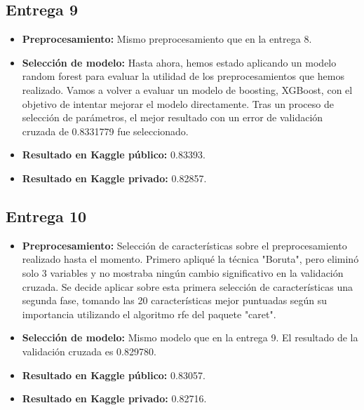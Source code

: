 \subsection{Entrega 9} %
\begin{itemize}
\item \textbf{Preprocesamiento:} Mismo preprocesamiento que en la entrega 8.
\item \textbf{Selección de modelo:} Hasta ahora, hemos estado aplicando un modelo random forest para evaluar la utilidad de los preprocesamientos que hemos realizado. Vamos a volver a evaluar un modelo de boosting, XGBoost, con el objetivo de intentar mejorar el modelo directamente. Tras un proceso de selección de parámetros, el mejor resultado con un error de validación cruzada de 0.8331779 fue seleccionado.
\item \textbf{Resultado en Kaggle público:} 0.83393.
\item \textbf{Resultado en Kaggle privado:} 0.82857.
\end{itemize}

\subsection{Entrega 10}
\begin{itemize}
\item \textbf{Preprocesamiento:} Selección de características sobre el preprocesamiento realizado hasta el momento. Primero apliqué la técnica "Boruta", pero eliminó solo 3 variables y no mostraba ningún cambio significativo en la validación cruzada. Se decide aplicar sobre esta primera selección de características una segunda fase, tomando las 20 características mejor puntuadas según su importancia utilizando el algoritmo rfe del paquete "caret".
\item \textbf{Selección de modelo:} Mismo modelo que en la entrega 9. El resultado de la validación cruzada es 0.829780.
\item \textbf{Resultado en Kaggle público:} 0.83057.
\item \textbf{Resultado en Kaggle privado:} 0.82716.
\end{itemize}

